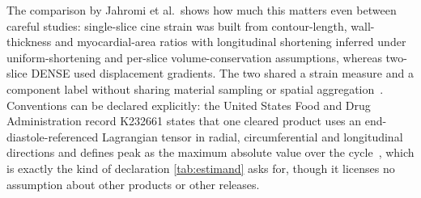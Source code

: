 The comparison by Jahromi et al.\ shows how much this matters even between careful studies:
single-slice cine strain was built from contour-length, wall-thickness and myocardial-area ratios
with longitudinal shortening inferred under uniform-shortening and per-slice volume-conservation
assumptions, whereas two-slice DENSE used displacement gradients. The two shared a strain measure
and a component label without sharing material sampling or spatial
aggregation~\citep[Eqs.~1--6]{jahromi2026densecine}. Conventions can be declared explicitly: the
United States Food and Drug Administration record K232661 states that one cleared product uses an
end-diastole-referenced Lagrangian tensor in radial, circumferential and longitudinal directions and
defines peak as the maximum absolute value over the cycle~\citep{fdaK232661}, which is exactly the
kind of declaration \cref{tab:estimand} asks for, though it licenses no assumption about other
products or other releases.


